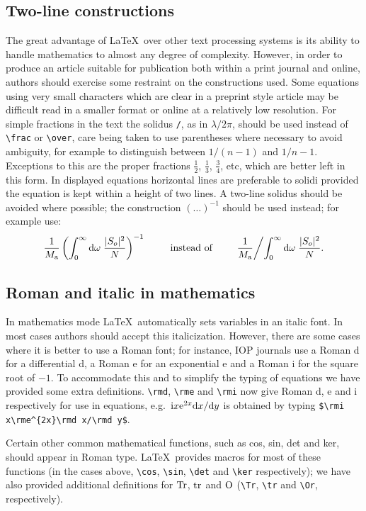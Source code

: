 \documentclass[12pt]{iopart}
\begin{document}
\subsection{Two-line constructions}
The great advantage of \LaTeX\ 
over other text processing systems is its 
ability to handle mathematics to almost any degree of complexity. However, 
in order to produce an article suitable for publication both within a print journal and online, 
authors should exercise some restraint on the constructions used. Some equations using very small characters which are clear in a preprint style article may be difficult read in a smaller format or online at a relatively low resolution.
For simple fractions in the text the solidus \verb"/", as in 
$\lambda/2\pi$, should be used instead of \verb"\frac" or \verb"\over", 
care being taken to use parentheses where necessary to avoid ambiguity, 
for example to distinguish between $1/(n-1)$ and $1/n-1$. Exceptions to 
this are the proper fractions $\frac12$, $\frac13$, $\frac34$, 
etc, which are better left in this form. In displayed equations 
horizontal lines are preferable to solidi provided the equation is 
kept within a height of two lines. A two-line solidus should be 
avoided where possible; the construction $(\ldots)^{-1}$ should be 
used instead; for example use:
\begin{equation*}
\frac{1}{M_{\rm a}}\left(\int^\infty_0{\rm d}
\omega\;\frac{|S_o|^2}{N}\right)^{-1}\qquad\mbox{instead of}\qquad
\frac{1}{M_{\rm a}}\biggl/\int^\infty_0{\rm d}
\omega\;\frac{|S_o|^2}{N}.
\end{equation*}

\subsection{Roman and italic in mathematics}
In mathematics mode \LaTeX\ automatically sets variables in an italic 
font. In most cases authors should accept this italicization. However, 
there are some cases where it is better to use a Roman font; for 
instance, IOP journals use a Roman d for a differential d, a Roman e 
for an exponential e and a Roman i for the square root of $-1$. To 
accommodate this and to simplify the  typing of equations we have 
provided some extra definitions. \verb"\rmd", \verb"\rme" and \verb"\rmi" 
now give Roman d, e and i respectively for use in equations, 
e.g.\ $\rmi x\rme^{2x}\rmd x/\rmd y$ 
is obtained by typing \verb"$\rmi x\rme^{2x}\rmd x/\rmd y$". 
 

Certain other common mathematical functions, such as cos, sin, det and 
ker, should appear in Roman type. \LaTeX\ provides macros for 
most of these functions 
(in the cases above, \verb"\cos", \verb"\sin", \verb"\det" and \verb"\ker" 
respectively); we have also provided 
additional definitions for $\Tr$, $\tr$ and 
$\Or$ (\verb"\Tr", \verb"\tr" and \verb"\Or", respectively). 
\end{document}
